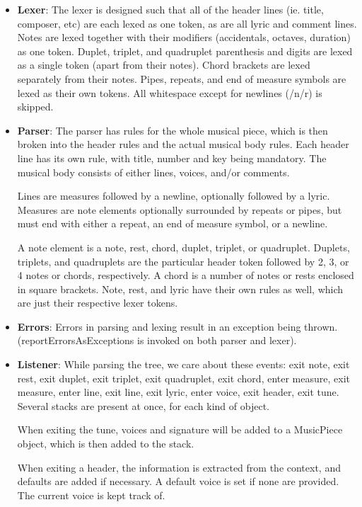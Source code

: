 \documentclass[12pt]{book}
\begin{document}
\bigskip

\begin{itemize}
\item {\bf Lexer}: The lexer is designed such that all of the header lines (ie. title, composer, etc) are each lexed as one token, as are all lyric and comment lines. Notes are lexed together with their modifiers (accidentals, octaves, duration) as one token. Duplet, triplet, and quadruplet parenthesis and digits are lexed as a single token (apart from their notes). Chord brackets are lexed separately from their notes. Pipes, repeats, and end of measure symbols are lexed as their own tokens. All whitespace except for newlines (/n/r) is skipped.

\item {\bf Parser}: The parser has rules for the whole musical piece, which is then broken into the header rules and the actual musical body rules. Each header line has its own rule, with title, number and key being mandatory. The musical body consists of either lines, voices, and/or comments. 

Lines are measures followed by a newline, optionally followed by a lyric. Measures are note elements optionally surrounded by repeats or pipes, but must end with either a repeat, an end of measure symbol, or a newline. 

A note element is a note, rest, chord, duplet, triplet, or quadruplet. Duplets, triplets, and quadruplets are the particular header token followed by 2, 3, or 4 notes or chords, respectively. A chord is a number of notes or rests enclosed in square brackets. Note, rest, and lyric have their own rules as well, which are just their respective lexer tokens.

\item {\bf Errors}: Errors in parsing and lexing result in an exception being thrown. (reportErrorsAsExceptions is invoked on both parser and lexer).

\item {\bf Listener}: While parsing the tree, we care about these events: exit note, exit rest, exit duplet, exit triplet, exit quadruplet, exit chord, enter measure, exit measure, enter line, exit line, exit lyric, enter voice, exit header, exit tune. Several stacks are present at once, for each kind of object.

When exiting the tune, voices and signature will be added to a MusicPiece object, which is then added to the stack.

When exiting a header, the information is extracted from the context, and defaults are added if necessary. A default voice is set if none are provided. The current voice is kept track of.


\end{itemize}
\end{document}
